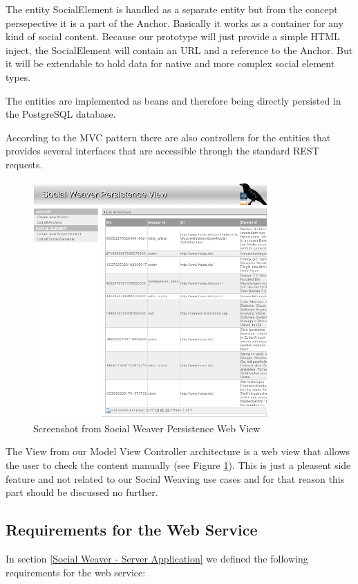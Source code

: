 The entity SocialElement is handled as a separate entity but from the concept persepective it is a part of the Anchor. Basically it works as a container for any kind of social content. Because our prototype will just provide a simple HTML inject, the SocialElement will contain an URL and a reference to the Anchor. But it will be extendable to hold data for native and more complex social element types. 

The entities are implemented as beans and therefore being directly persisted in the PostgreSQL database.

According to the MVC pattern there are also controllers for the entities that provides several interfaces that are accessible through the standard REST requests. 

\begin{figure}[h!] \centering
		\includegraphics[width=9cm]{images/sowe-mvc-view-screenshot.png}
		\caption{Screenshot from Social Weaver Persistence Web View}
		\label{sowe-mvc-view-screenshot}
\end{figure} 

The View from our Model View Controller architecture is a web view that allows the user to check the content manually (see Figure \ref{sowe-mvc-view-screenshot}). This is just a pleasent side feature and not related to our Social Weaving use cases and for that reason this part should be discussed no further.


\subsection{Requirements for the Web Service}
In section \ref{Social Weaver - Server Application} we defined the following requirements for the web service:

